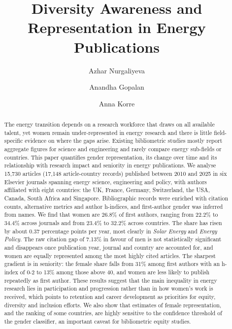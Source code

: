 \documentclass[preprint,12pt,number]{elsarticle}
\newcommand{\note}[1]{\textcolor{blue}{[NOTE: #1]}}
\begin{document}
\begin{frontmatter}

\title{Diversity Awareness and Representation in Energy Publications}

\author[imp]{Azhar Nurgaliyeva}
\author[imp]{Anandha Gopalan}
\author[imp]{Anna Korre}


\begin{abstract}
The energy transition depends on a research workforce that draws on all available talent, yet women remain under-represented in energy research and there is little field-specific evidence on where the gaps arise. Existing bibliometric studies mostly report aggregate figures for science and engineering and rarely compare energy sub-fields or countries. This paper quantifies gender representation, its change over time and its relationship with research impact and seniority in energy publications. We analyse 15,730 articles (17,148 article-country records) published between 2010 and 2025 in six Elsevier journals spanning energy science, engineering and policy, with authors affiliated with eight countries: the UK, France, Germany, Switzerland, the USA, Canada, South Africa and Singapore. Bibliographic records were enriched with citation counts, alternative metrics and author h-indices, and first-author gender was inferred from names. We find that women are 26.8\% of first authors, ranging from 22.2\% to 34.4\% across journals and from 23.4\% to 32.2\% across countries. The share has risen by about 0.37 percentage points per year, most clearly in \textit{Solar Energy} and \textit{Energy Policy}. The raw citation gap of 7.13\% in favour of men is not statistically significant and disappears once publication year, journal and country are accounted for, and women are equally represented among the most highly cited articles. The sharpest gradient is in seniority: the female share falls from 31\% among first authors with an h-index of 0-2 to 13\% among those above 40, and women are less likely to publish repeatedly as first author. These results suggest that the main inequality in energy research lies in participation and progression rather than in how women's work is received, which points to retention and career development as priorities for equity, diversity and inclusion efforts. We also show that estimates of female representation, and the ranking of some countries, are highly sensitive to the confidence threshold of the gender classifier, an important caveat for bibliometric equity studies.
\end{abstract}


\end{frontmatter}
\end{document}
